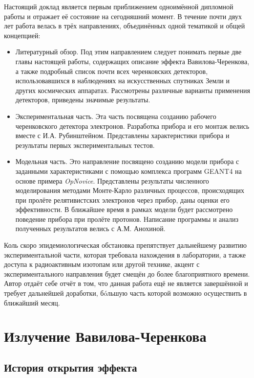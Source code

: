\documentclass[12pt,a4paper]{report} %
\begin{document}
Настоящий доклад является первым приближением одноимённой дипломной работы и отражает её состояние на сегодняшний момент.
В течение почти двух лет работа велась в трёх направлениях, объединённых одной тематикой и общей концепцией:
\begin{itemize}
	\item Литературный обзор. Под этим направлением следует понимать первые две главы настоящей работы, содержащих описание эффекта Вавилова-Черенкова, а также подробный список почти всех черенковских детекторов, использовавшихся в наблюдениях на искусственных спутниках Земли и других космических аппаратах. Рассмотрены различные варианты применения детекторов, приведены значимые  результаты.
	\item Экспериментальная часть. Эта часть посвящена созданию рабочего черенковского детектора электронов. Разработка прибора и его монтаж велись вместе с И.А. Рубинштейном. Представлены характеристики прибора и результаты первых экспериментальных тестов.
	\item Модельная часть. Это направление посвящено созданию модели прибора с заданными характеристиками с помощью комплекса программ GEANT4 на основе примера \textit{OpNovice}. Представлены результаты численного моделирования методами Монте-Карло различных процессов, происходящих при пролёте релятивистских электронов через прибор, даны оценки его эффективности. В ближайшее время в рамках модели будет рассмотрено поведение прибора при пролёте протонов. Написание программы и анализ полученных результатов велись с А.М. Анохиной.
\end{itemize}
 Коль скоро эпидемиологическая обстановка препятствует дальнейшему развитию экспериментальной части, которая требовала нахождения в лаборатории, а также доступа к радиоактивным изотопам или другой технике, акцент с экспериментального направления будет смещён до более благоприятного времени. Автор отдаёт себе отчёт в том, что данная работа ещё не является завершённой и требует дальнейшей доработки, б\'oльшую часть которой возможно осуществить в ближайший месяц.

\chapter{Излучение Вавилова-Черенкова}
\section{История открытия эффекта}
\end{document}

